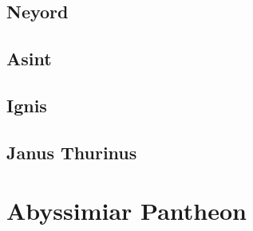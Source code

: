 \begin{multicols}{2}
\subsection{Neyord}

\subsection{Asint}

\subsection{Ignis}

\subsection{Janus Thurinus}

\end{multicols}

\section{Abyssimiar Pantheon}

\newpage
